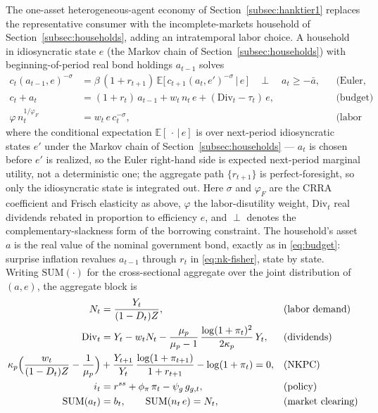 \documentclass[12pt]{article}
\newcommand{\E}{\mathbb{E}}
\newcommand{\vphi}{\varphi}
\begin{document}
The one-asset heterogeneous-agent economy of
Section~\ref{subsec:hanktier1} replaces the representative consumer with the
incomplete-markets household of Section~\ref{subsec:households}, adding an
intratemporal labor choice. A household in idiosyncratic state $e$ (the
Markov chain of Section~\ref{subsec:households}) with beginning-of-period
real bond holdings $a_{t-1}$ solves
\begin{align}
c_t(a_{t-1},e)^{-\sigma} &= \beta\,(1+r_{t+1})\,
   \E\!\big[\,c_{t+1}(a_t,e')^{-\sigma}\,\big|\,e\,\big]
   \quad\perp\quad a_t \ge -\bar a, &&\text{(Euler, borrowing constraint)}
   \label{eq:hank-euler}\\
c_t + a_t &= (1+r_t)\,a_{t-1} + w_t\, n_t\, e + (\mathrm{Div}_t-\tau_t)\,e,
   &&\text{(budget)} \label{eq:hank-budget}\\
\vphi\, n_t^{1/\varphi_F} &= w_t\, e\, c_t^{-\sigma},
   &&\text{(labor supply)} \label{eq:hank-labor}
\end{align}
where the conditional expectation $\E[\,\cdot\,|\,e]$ is over next-period
idiosyncratic states $e'$ under the Markov chain of
Section~\ref{subsec:households} --- $a_t$ is chosen before $e'$ is realized, so
the Euler right-hand side is expected next-period marginal utility, not a
deterministic one; the aggregate path $\{r_{t+1}\}$ is perfect-foresight, so
only the idiosyncratic state is integrated out. Here $\sigma$ and $\varphi_F$
are the CRRA coefficient and Frisch elasticity as
above, $\vphi$ the labor-disutility weight, $\mathrm{Div}_t$ real dividends
rebated in proportion to efficiency $e$, and $\perp$ denotes the
complementary-slackness form of the borrowing constraint. The household's asset $a$ is the real value of the nominal
government bond, exactly as in \eqref{eq:budget}: surprise inflation
revalues $a_{t-1}$ through $r_t$ in \eqref{eq:nk-fisher}, state by state.
Writing $\mathrm{SUM}(\cdot)$ for the cross-sectional aggregate over the
joint distribution of $(a,e)$, the aggregate block is
\begin{align}
N_t &= \frac{Y_t}{(1-D_t)Z}, &&\text{(labor demand)} \label{eq:hank-labdemand}\\
\mathrm{Div}_t &= Y_t - w_t N_t
   - \frac{\mu_p}{\mu_p-1}\,\frac{\log(1+\pi_t)^2}{2\kappa_p}\,Y_t,
   &&\text{(dividends)} \label{eq:hank-div}\\
\kappa_p\Bigl(\frac{w_t}{(1-D_t)Z}-\frac{1}{\mu_p}\Bigr)
   &+ \frac{Y_{t+1}}{Y_t}\,\frac{\log(1+\pi_{t+1})}{1+r_{t+1}}
   - \log(1+\pi_t) = 0, &&\text{(NKPC)} \label{eq:hank-nkpc}\\
i_t &= r^{ss} + \phi_\pi\,\pi_t - \psi_g\, g_{g,t}, &&\text{(policy)} \label{eq:hank-policy}\\
\mathrm{SUM}(a_t) &= b_t, \qquad \mathrm{SUM}(n_t\, e) = N_t,
   &&\text{(market clearing)} \label{eq:hank-clearing}
\end{align}
\end{document}
